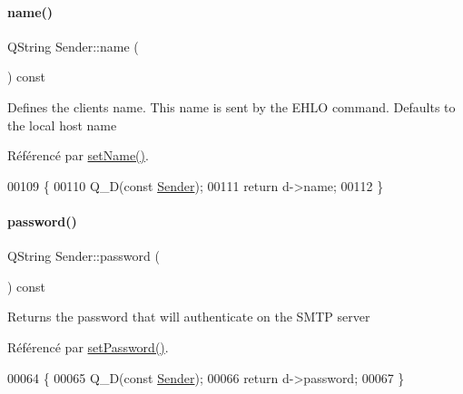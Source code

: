 \paragraph{\texorpdfstring{name()}{name()}}
{\footnotesize\ttfamily Q\+String Sender\+::name (\begin{DoxyParamCaption}{ }\end{DoxyParamCaption}) const}

Defines the client\textquotesingle{}s name. This name is sent by the E\+H\+LO command. Defaults to the local host name 

Référencé par \hyperlink{class_simple_mail_1_1_sender_a02d30b604180e3502d6c773751a6c1e6}{set\+Name()}.


\begin{DoxyCode}
00109 \{
00110     Q\_D(\textcolor{keyword}{const} \hyperlink{class_simple_mail_1_1_sender}{Sender});
00111     \textcolor{keywordflow}{return} d->name;
00112 \}
\end{DoxyCode}
\mbox{\label{class_simple_mail_1_1_sender_adc225693c32f66e746fec828a4da2bb6}} 
\paragraph{\texorpdfstring{password()}{password()}}
{\footnotesize\ttfamily Q\+String Sender\+::password (\begin{DoxyParamCaption}{ }\end{DoxyParamCaption}) const}

Returns the password that will authenticate on the S\+M\+TP server 

Référencé par \hyperlink{class_simple_mail_1_1_sender_ae71f3d10ecc970e5c56ac01b1f05ff9b}{set\+Password()}.


\begin{DoxyCode}
00064 \{
00065     Q\_D(\textcolor{keyword}{const} \hyperlink{class_simple_mail_1_1_sender}{Sender});
00066     \textcolor{keywordflow}{return} d->password;
00067 \}
\end{DoxyCode}
\mbox{\label{class_simple_mail_1_1_sender_ab0ae5815669d32f46dfd1758c3a34590}} 
